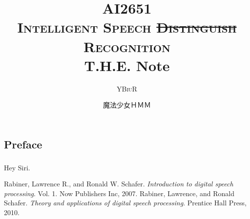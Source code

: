 \documentclass[oneside]{book}
\title{\textsc{AI2651\\Intelligent Speech \sout{Distinguish} Recognition}\\ T.H.E. Note}
\author{\textsc{YBiuR}}
\date{魔法少女ＨＭＭ}
\theoremstyle{definition}
\theoremstyle{remark}
\begin{document}
\begin{spacing}{1.5}
\setlength{\parindent}{0em}

\frontmatter
\maketitle
\chapter*{Preface}
\paragraph{}Hey Siri.
\mainmatter



\begin{thebibliography}{42}
     Rabiner, Lawrence R., and Ronald W. Schafer. \textit{Introduction to digital speech processing}. Vol. 1. Now Publishers Inc, 2007.
     Rabiner, Lawrence, and Ronald Schafer. \textit{Theory and applications of digital speech processing}. Prentice Hall Press, 2010.
\end{thebibliography}

\end{spacing}
\end{document}
